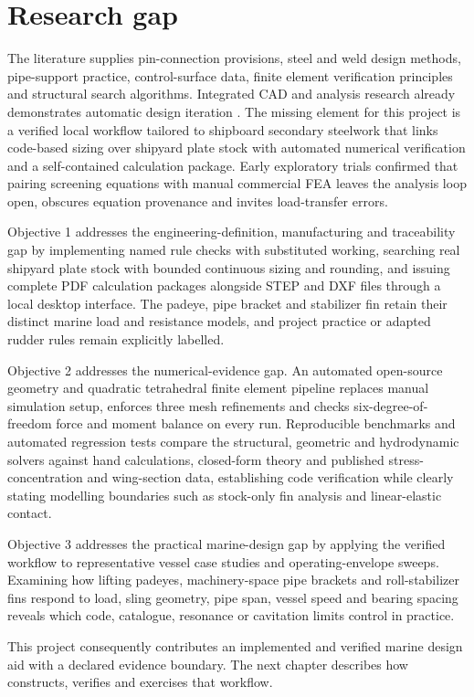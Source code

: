 \section{Research gap}
\label{sec:lit-research-gap}

The literature supplies pin-connection provisions, steel and weld design methods, pipe-support practice, control-surface data, finite element verification principles and structural search algorithms. Integrated CAD and analysis research already demonstrates automatic design iteration \cite{park2010,nolan2015}. The missing element for this project is a verified local workflow tailored to shipboard secondary steelwork that links code-based sizing over shipyard plate stock with automated numerical verification and a self-contained calculation package. Early exploratory trials confirmed that pairing screening equations with manual commercial FEA leaves the analysis loop open, obscures equation provenance and invites load-transfer errors.

Objective 1 addresses the engineering-definition, manufacturing and traceability gap by implementing named rule checks with substituted working, searching real shipyard plate stock with bounded continuous sizing and rounding, and issuing complete PDF calculation packages alongside STEP and DXF files through a local desktop interface. The padeye, pipe bracket and stabilizer fin retain their distinct marine load and resistance models, and project practice or adapted rudder rules remain explicitly labelled.

Objective 2 addresses the numerical-evidence gap. An automated open-source geometry and quadratic tetrahedral finite element pipeline replaces manual simulation setup, enforces three mesh refinements and checks six-degree-of-freedom force and moment balance on every run. Reproducible benchmarks and automated regression tests compare the structural, geometric and hydrodynamic solvers against hand calculations, closed-form theory and published stress-concentration and wing-section data, establishing code verification while clearly stating modelling boundaries such as stock-only fin analysis and linear-elastic contact.

Objective 3 addresses the practical marine-design gap by applying the verified workflow to representative vessel case studies and operating-envelope sweeps. Examining how lifting padeyes, machinery-space pipe brackets and roll-stabilizer fins respond to load, sling geometry, pipe span, vessel speed and bearing spacing reveals which code, catalogue, resonance or cavitation limits control in practice.

This project consequently contributes an implemented and verified marine design aid with a declared evidence boundary. The next chapter describes how \NEMO{} constructs, verifies and exercises that workflow.
